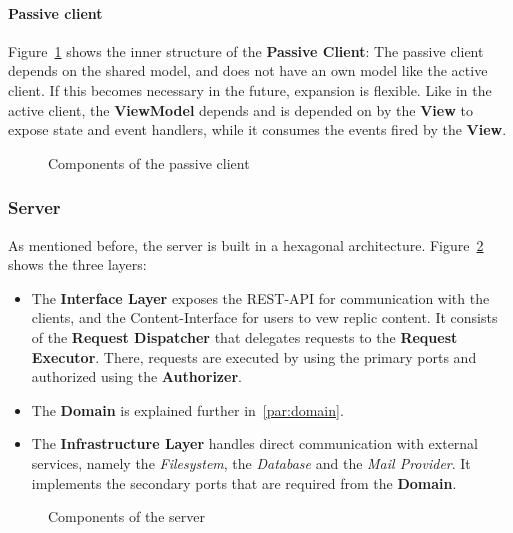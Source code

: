 \paragraph{Passive client}
Figure~\ref{fig:component-clients-passive} shows the inner structure of the \textbf{Passive Client}: The passive client depends on the shared model, and does not have an own model like the active client.
If this becomes necessary in the future, expansion is flexible.
Like in the active client, the \textbf{ViewModel} depends and is depended on by the \textbf{View} to expose state and event handlers, while it consumes the events fired by the \textbf{View}.

\begin{figure}
    \centering
    \caption{Components of the passive client}
    \label{fig:component-clients-passive}
\end{figure}

\subsubsection{Server}
As mentioned before, the server is built in a hexagonal architecture.
Figure~\ref{fig:component-server} shows the three layers:
\begin{itemize}
    \item The \textbf{Interface Layer} exposes the REST-API for communication with the clients, and the Content-Interface for users to vew replic content.
    It consists of the \textbf{Request Dispatcher} that delegates requests to the \textbf{Request Executor}.
    There, requests are executed by using the primary ports and authorized using the \textbf{Authorizer}.
    \item The \textbf{Domain} is explained further in~\ref{par:domain}.
    \item The \textbf{Infrastructure Layer} handles direct communication with external services, namely the \textit{Filesystem}, the \textit{Database} and the \textit{Mail Provider}.
    It implements the secondary ports that are required from the \textbf{Domain}.
\end{itemize}

\begin{figure}
    \centering
    \caption{Components of the server}
    \label{fig:component-server}
\end{figure}

